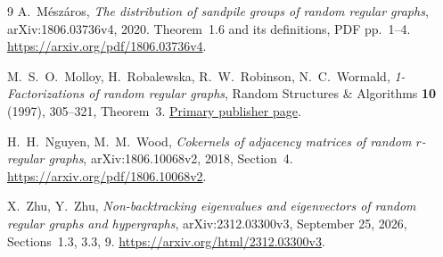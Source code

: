 \documentclass[11pt]{article}
\begin{document}
\begin{thebibliography}{9}
A.~M\'esz\'aros, \emph{The distribution of sandpile groups of random regular graphs}, arXiv:1806.03736v4, 2020. Theorem~1.6 and its definitions, PDF pp.~1--4.
\url{https://arxiv.org/pdf/1806.03736v4}.

M.~S.~O.~Molloy, H.~Robalewska, R.~W.~Robinson, N.~C.~Wormald,
\emph{1-Factorizations of random regular graphs}, Random Structures \& Algorithms \textbf{10} (1997), 305--321, Theorem~3.
\href{https://onlinelibrary.wiley.com/doi/10.1002/\%28SICI\%291098-2418\%28199705\%2910\%3A3\%3C305\%3A\%3AAID-RSA1\%3E3.0.CO\%3B2-\%23}{Primary publisher page}.

H.~H.~Nguyen, M.~M.~Wood, \emph{Cokernels of adjacency matrices of random $r$-regular graphs}, arXiv:1806.10068v2, 2018, Section~4.
\url{https://arxiv.org/pdf/1806.10068v2}.

X.~Zhu, Y.~Zhu, \emph{Non-backtracking eigenvalues and eigenvectors of random regular graphs and hypergraphs}, arXiv:2312.03300v3, September 25, 2026, Sections~1.3, 3.3, 9.
\url{https://arxiv.org/html/2312.03300v3}.
\end{thebibliography}
\end{document}
